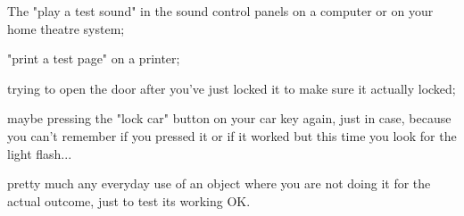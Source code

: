 \documentclass[online,12pt,helvetica]{chaksem}
\begin{document}
The "play a test sound" in the sound control panels on a computer or on your home theatre                                                                      
system;                                                                                                                                                        
                                                                                                                                                               
"print a test page" on a printer;                                                                                                                              
                                                                                                                                                               
trying to open the door after you've                                                                                                                           
just locked it to make sure it actually locked;                                                                                                                
                                                                                                                                                               
maybe pressing the "lock car"                                                                                                                                  
button on your car key again, just in case, because you can't remember if you                                                                                  
pressed it or if it worked but this time you look for the light flash...                                                                                       
                                                                                                                                                               
pretty much any everyday use of an object where you are not doing it for the actual                                                                            
outcome, just to test its working OK.                                                                                                                          
                                                                                                                                                               
\end{document}
